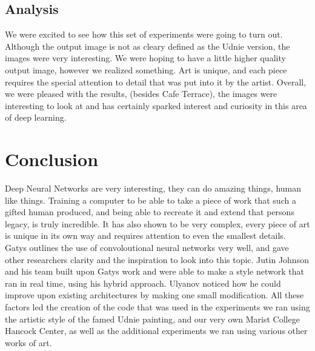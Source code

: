 \documentclass[12pt]{article}
\begin{document}
\subsection{Analysis}
We were excited to see how this set of experiments were going to turn out. Although the output image is not as cleary defined as the Udnie version, the images were very interesting. We were hoping to have a little higher quality output image, however we realized something. Art is unique, and each piece requires the special attention to detail that was put into it by the artist. Overall, we were pleased with the results, (besides Cafe Terrace), the images were interesting to look at and has certainly sparked interest and curiosity in this area of deep learning.

\section{Conclusion}
Deep Neural Networks are very interesting, they can do amazing things, human like things. Training a computer to be able to take a piece of work that such a gifted human produced, and being able to recreate it and extend that persons legacy, is truly incredible. It has also shown to be very complex, every piece of art is unique in its own way and requires attention to even the smallest details. Gatys outlines the use of convoloutional neural networks very well, and gave other researchers clarity and the inspiration to look into this topic. Jutin Johnson and his team built upon Gatys work and were able to make a style network that ran in real time, using his hybrid approach. Ulyanov noticed how he could improve upon existing architectures by making one small modification. All these factors led the creation of the code that was used in the experiments we ran using the artistic style of the famed Udnie painting, and our very own Marist College Hancock Center, as well as the additional experiments we ran using various other works of art.
\end{document}
